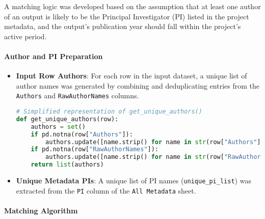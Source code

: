 \documentclass[12pt]{article}
\begin{document}
A matching logic was developed based on the assumption that at least one
author of an output is likely to be the Principal Investigator (PI)
listed in the project metadata, and the output's publication year should
fall within the project's active period.

\paragraph{Author and PI
Preparation}\label{author-and-pi-preparation}

\begin{itemize}
\item
  \textbf{Input Row Authors}: For each row in the input dataset, a
  unique list of author names was generated by combining and
  deduplicating entries from the \texttt{Authors} and
  \texttt{RawAuthorNames} columns.

\begin{lstlisting}[language=Python]
# Simplified representation of get_unique_authors()
def get_unique_authors(row):
    authors = set()
    if pd.notna(row["Authors"]):
        authors.update([name.strip() for name in str(row["Authors"]).split(";") if name.strip()])
    if pd.notna(row["RawAuthorNames"]):
        authors.update([name.strip() for name in str(row["RawAuthorNames"]).split(";") if name.strip()])
    return list(authors)
\end{lstlisting}
\item
  \textbf{Unique Metadata PIs}: A unique list of PI names
  (\texttt{unique\_pi\_list}) was extracted from the \texttt{PI} column
  of the \texttt{All\ Metadata} sheet.
\end{itemize}

\paragraph{Matching Algorithm}\label{matching-algorithm}
\end{document}
